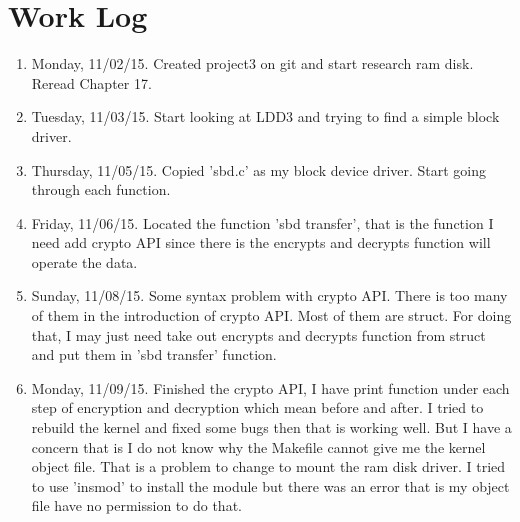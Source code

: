 \documentclass[letterpaper,11pt,titlepage]{article}
\begin{document}
\section{Work Log}
\begin{enumerate}

\item Monday, 11/02/15. Created project3 on git and start research ram disk. Reread Chapter 17.

\item Tuesday, 11/03/15. Start looking at LDD3 and trying to find a simple block driver.
\item Thursday, 11/05/15. Copied 'sbd.c' as my block device driver. Start going through each function.

\item Friday, 11/06/15. Located the function 'sbd transfer', that is the function I need add crypto API since there is the encrypts and decrypts function will operate the data. 
\item Sunday, 11/08/15. Some syntax problem with crypto API. There is too many of them in the introduction of crypto API. Most of them are struct. For doing that, I may just need take out encrypts and decrypts function from struct and put them in 'sbd transfer' function.

\item Monday, 11/09/15. Finished the crypto API, I have print function under each step of encryption and decryption which mean before and after. I tried to rebuild the kernel and fixed some bugs then that is working well. But I have a concern that is I do not know why the Makefile cannot give me the kernel object file. That is a problem to change to mount the ram disk driver. 
I tried to use 'insmod' to install the module but there was an error that is my object file have no permission to do that. 

\end{enumerate}
\end{document}
